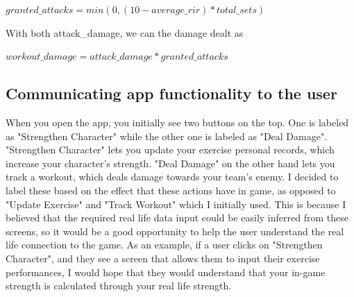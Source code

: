 \documentclass{l4proj}
\begin{document}
\begin{algorithm}
  $granted\_attacks = min(0, (10 - average\_rir) * total\_sets)$
\end{algorithm}

With both attack\_damage, we can the damage dealt as 

\begin{algorithm}
  $workout\_damage = attack\_damage * granted\_attacks$ 
\end{algorithm}


\subsection{Communicating app functionality to the user}
When you open the app, you initially see two buttons on the top. One is labeled as "Strengthen Character" while the other one is labeled as "Deal Damage". "Strengthen Character" lets you update your exercise personal records, which increase your character's strength. "Deal Damage" on the other hand lets you track a workout, which deals damage towards your team's enemy. I decided to label these based on the effect that these actions have in game, as opposed to "Update Exercise" and "Track Workout" which I initially used. This is because I believed that the required real life data input could be easily inferred from these screens, so it would be a good opportunity to help the user understand the real life connection to the game. As an example, if a user clicks on "Strengthen Character", and they see a screen that allows them to input their exercise performances, I would hope that they would understand that your in-game strength is calculated through your real life strength.
\end{document}
